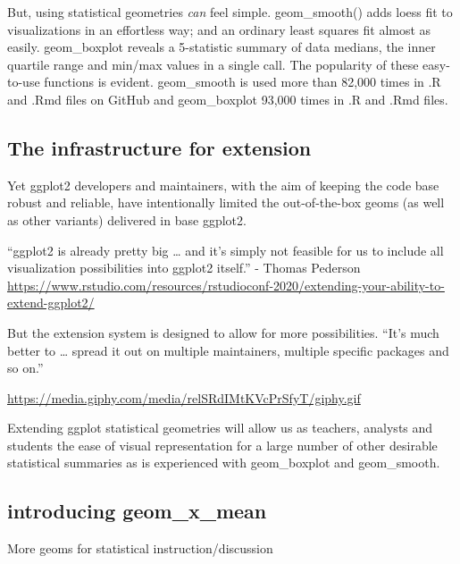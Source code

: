 \documentclass[12pt]{article}
\begin{document}
But, using statistical geometries \emph{can} feel simple. geom\_smooth()
adds loess fit to visualizations in an effortless way; and an ordinary
least squares fit almost as easily. geom\_boxplot reveals a 5-statistic
summary of data medians, the inner quartile range and min/max values in
a single call. The popularity of these easy-to-use functions is evident.
geom\_smooth is used more than 82,000 times in .R and .Rmd files on
GitHub and geom\_boxplot 93,000 times in .R and .Rmd files.

\hypertarget{the-infrastructure-for-extension}{%
\subsection{The infrastructure for
extension}\label{the-infrastructure-for-extension}}

Yet ggplot2 developers and maintainers, with the aim of keeping the code
base robust and reliable, have intentionally limited the out-of-the-box
geoms (as well as other variants) delivered in base ggplot2.

``ggplot2 is already pretty big \ldots{} and it's simply not feasible
for us to include all visualization possibilities into ggplot2 itself.''
- Thomas Pederson
\url{https://www.rstudio.com/resources/rstudioconf-2020/extending-your-ability-to-extend-ggplot2/}

But the extension system is designed to allow for more possibilities.
``It's much better to \ldots{} spread it out on multiple maintainers,
multiple specific packages and so on.''

\url{https://media.giphy.com/media/relSRdIMtKVcPrSfyT/giphy.gif}

Extending ggplot statistical geometries will allow us as teachers,
analysts and students the ease of visual representation for a large
number of other desirable statistical summaries as is experienced with
geom\_boxplot and geom\_smooth.

\hypertarget{introducing-geom_x_mean}{%
\subsection{introducing geom\_x\_mean}\label{introducing-geom_x_mean}}

More geoms for statistical instruction/discussion
\end{document}
